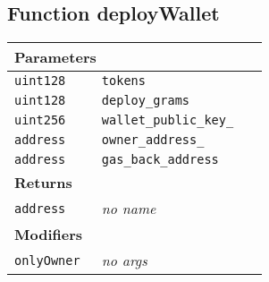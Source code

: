 \subsection{Function deployWallet}


\ifsoltables
\noindent\begin{tabular}{|l|l|p{5cm}|}\hline
\multicolumn{3}{|l|}{\bf Parameters}\\\hline
\tt uint128 & \tt tokens &\\\hline
\tt uint128 & \tt deploy\_{}grams &\\\hline
\tt uint256 & \tt wallet\_{}public\_{}key\_{} &\\\hline
\tt address & \tt owner\_{}address\_{} &\\\hline
\tt address & \tt gas\_{}back\_{}address &\\\hline
\multicolumn{3}{|l|}{\bf Returns}\\\hline
\tt address & {\em no name} &\\\hline
\multicolumn{3}{|l|}{\bf Modifiers}\\\hline
\tt onlyOwner & {\em no args} &\\\hline
\end{tabular}
\fi

\vspace{2cm}

